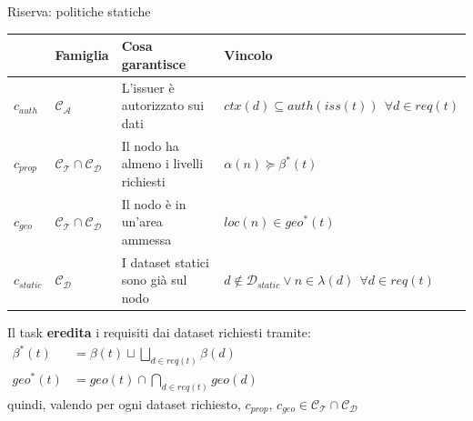 \documentclass[aspectratio=169,12pt]{beamer}
\begin{document}
\begin{frame}{Riserva: politiche statiche}
\begin{center}
{\small
\begin{tabular}{@{}llll@{}}
\toprule
 & \textbf{Famiglia} & \textbf{Cosa garantisce} & \textbf{Vincolo} \\
\midrule
$c_{auth}$ & $\mathcal{C_A}$ & L'issuer è autorizzato sui dati & $ctx(d) \subseteq auth(iss(t))\ \ \forall d \in req(t)$ \\[1.5mm]
$c_{prop}$ & $\mathcal{C_T} \cap \mathcal{C_D}$ & Il nodo ha almeno i livelli richiesti & $\alpha(n) \succeq \beta^*(t)$ \\[1.5mm]
$c_{geo}$ & $\mathcal{C_T} \cap \mathcal{C_D}$ & Il nodo è in un'area ammessa & $loc(n) \in geo^*(t)$ \\[1.5mm]
$c_{static}$ & $\mathcal{C_D}$ & I dataset statici sono già sul nodo & $d \notin \mathcal{D}_{static} \lor n \in \lambda(d)\ \ \forall d \in req(t)$ \\
\bottomrule
\end{tabular}}
\end{center}
\vspace{2mm}
\begin{center}
\small
Il task \textbf{eredita} i requisiti dai dataset richiesti tramite:\\[2mm]
$\begin{aligned}
\beta^*(t) &= \beta(t) \sqcup \textstyle\bigsqcup_{d \in req(t)} \beta(d)\\[0.5mm]
geo^*(t) &= geo(t) \cap \textstyle\bigcap_{d \in req(t)} geo(d)
\end{aligned}$\\[2mm]
quindi, valendo per ogni dataset richiesto, $c_{prop},\, c_{geo} \in \mathcal{C_T} \cap \mathcal{C_D}$
\end{center}
\end{frame}
\end{document}
